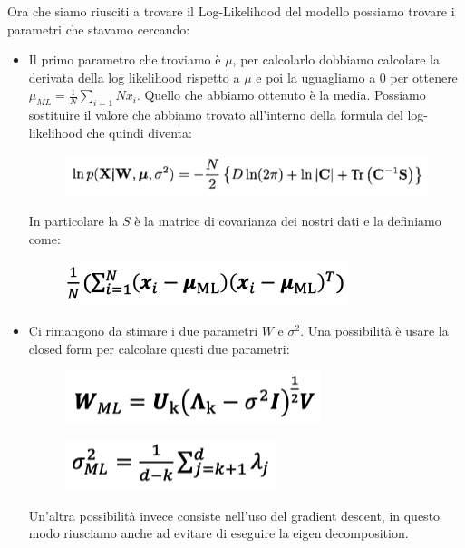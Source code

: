 \documentclass[14pt]{extreport}
\begin{document}
Ora che siamo riusciti a trovare il Log-Likelihood del modello possiamo trovare i parametri che stavamo cercando:
\begin{itemize}
	\item Il primo parametro che troviamo è $\mu$, per calcolarlo dobbiamo calcolare la derivata della log likelihood rispetto a $\mu$ e poi la 
	uguagliamo a 0 per ottenere $\mu_{ML} = \frac{1}{N}\sum_{i=1}{N}x_i$. Quello che abbiamo ottenuto è la media. Possiamo sostituire il valore che abbiamo 
	trovato all'interno della formula del log-likelihood che quindi diventa:
	\begin{figure}[H] 
	\centering
	\includegraphics[width=0.7\linewidth]{487.jpeg}
	\end{figure}
	In particolare la $S$ è la matrice di covarianza dei nostri dati e la definiamo come:
	\begin{figure}[H] 
	\centering
	\includegraphics[width=0.7\linewidth]{488.jpeg}
	\end{figure}
	\item Ci rimangono da stimare i due parametri $W$ e $\sigma^2$. Una possibilità è usare la closed form per calcolare questi due parametri:
	\begin{figure}[H] 
	\centering
	\includegraphics[width=0.7\linewidth]{493.jpeg}
	\end{figure}
	\begin{figure}[H] 
	\centering
	\includegraphics[width=0.7\linewidth]{492.jpeg}
	\end{figure}
	Un'altra possibilità
	invece consiste nell'uso del gradient descent, in questo modo riusciamo anche ad evitare di eseguire la eigen decomposition.
\end{itemize}
\end{document}
